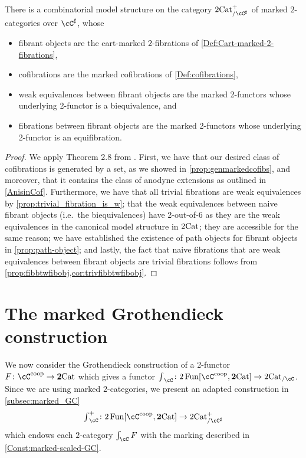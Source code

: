 \documentclass[11pt, dvipsnames]{amsart}
\begin{document}
	\begin{thm}\label{Thm:the ms}
	There is a combinatorial model structure on the category $\twocat^{+}_{/ \Csharp}$ of marked $2$-categories over $\cC^{\sharp}$, whose
	\begin{itemize}
    \item 
		fibrant objects are the cart-marked $2$-fibrations of \cref{Def:Cart-marked-2-fibrations},
		\item 
		cofibrations are the marked cofibrations  of \cref{Def:cofibrations}, 
		\item 
		weak equivalences between fibrant objects are the marked 2-functors whose underlying 2-functor is a biequivalence, and
		\item fibrations between fibrant objects are the marked 2-functors whose underlying 2-functor is an equifibration.
	\end{itemize}
	\end{thm}
	\begin{proof}
    	We apply Theorem 2.8 from \cite{guetta2023fibrantlyinduced}.
    	First, we have that our desired class of cofibrations is generated by a set, as we showed in \cref{prop:genmarkedcofibs}, and moreover, that it contains the class of anodyne extensions as outlined in \cref{AnisinCof}. Furthermore, we have that all trivial fibrations are weak equivalences by \cref{prop:trivial_fibration_is_w}; that the weak equivalences between naive fibrant objects (i.e.\ the biequivalences) have 2-out-of-6 as they are the weak equivalences in the canonical model structure in $2\mathrm{Cat}$; they are accessible for the same reason; we have established the existence of path objects for fibrant objects in \cref{prop:path-object}; and lastly, the fact that naive fibrations that are weak equivalences between fibrant objects are trivial fibrations follows from \cref{prop:fibbtwfibobj,cor:trivfibbtwfibobj}.
	\end{proof}

\section{The marked Grothendieck construction}\label{sec:mGC}

We now consider the Grothendieck construction of a 2-functor $F\colon \cC^{\coop}\to \ttwocat$ which gives a functor 
        $ {\textstyle \int}_{\cC}\colon 2\Fun[\cC^{\coop},\ttwocat]\to \twocat_{/\cC}$.
        Since we are using marked $2$-categories, we present an adapted construction in \cref{subsec:marked_GC}
        \[{\textstyle \int}_{\cC}^+\colon 2\Fun[\cC^{\coop},\ttwocat]\to \mslicetwocat \]
        which endows each $2$-category $\int_{\cC}F$ with the marking described in \cref{Const:marked-scaled-GC}. 
        
\end{document}
